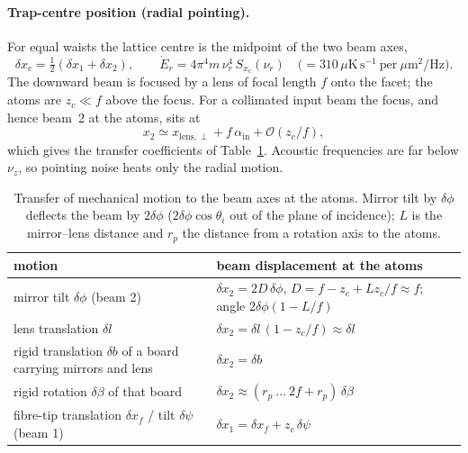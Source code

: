 \documentclass[11pt,a4paper]{article}
\begin{document}
\paragraph{Trap-centre position (radial pointing).} For equal waists the lattice centre is the midpoint of the two beam axes,
\begin{equation}
\delta x_c=\tfrac12(\delta x_1+\delta x_2),\qquad \dot E_r=4\pi^4 m\,\nu_r^4\,S_{x_c}(\nu_r)\quad\bigl(=310\,\mu\mathrm K\,\mathrm s^{-1}\ \text{per}\ \mu\mathrm m^2/\mathrm{Hz}\bigr).
\end{equation}
The downward beam is focused by a lens of focal length $f$ onto the facet; the atoms are $z_c\ll f$ above the focus. For a collimated input beam the focus, and hence beam~2 at the atoms, sits at
\begin{equation}
x_2\simeq x_\mathrm{lens,\perp}+f\,\alpha_\mathrm{in}+\mathcal O(z_c/f),
\end{equation}
which gives the transfer coefficients of Table~\ref{tab:transfer}. Acoustic frequencies are far below $\nu_z$, so pointing noise heats only the radial motion.

\begin{table}[h]
\centering
\caption{Transfer of mechanical motion to the beam axes at the atoms. Mirror tilt by $\delta\phi$ deflects the beam by $2\delta\phi$ ($2\delta\phi\cos\theta_i$ out of the plane of incidence); $L$ is the mirror--lens distance and $r_p$ the distance from a rotation axis to the atoms.}
\label{tab:transfer}
\small
\begin{tabular}{@{}>{\raggedright\arraybackslash}p{5.6cm}>{\raggedright\arraybackslash}p{9.2cm}@{}}
\toprule
motion & beam displacement at the atoms \\
\midrule
mirror tilt $\delta\phi$ (beam 2) & $\delta x_2=2D\,\delta\phi$, $D=f-z_c+Lz_c/f\approx f$; angle $2\delta\phi(1-L/f)$ \\
lens translation $\delta l$ & $\delta x_2=\delta l\,(1-z_c/f)\approx\delta l$ \\
rigid translation $\delta b$ of a board carrying mirrors and lens & $\delta x_2=\delta b$ \\
rigid rotation $\delta\beta$ of that board & $\delta x_2\approx(r_p\ \ldots\ 2f+r_p)\,\delta\beta$ \\
fibre-tip translation $\delta x_f$ / tilt $\delta\psi$ (beam 1) & $\delta x_1=\delta x_f+z_c\,\delta\psi$ \\
\bottomrule
\end{tabular}
\end{table}
\end{document}
